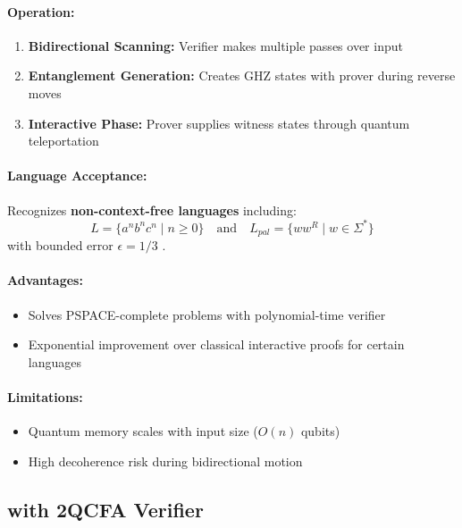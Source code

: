 \paragraph{Operation:}
\begin{enumerate}
    \item \textbf{Bidirectional Scanning:} Verifier makes multiple passes over input
    \item \textbf{Entanglement Generation:} Creates GHZ states with prover during reverse moves
    \item \textbf{Interactive Phase:} Prover supplies witness states through quantum teleportation
\end{enumerate}

\paragraph{Language Acceptance:}
Recognizes \textbf{non-context-free languages} including:
\[
L = \{a^nb^nc^n \mid n \geq 0\} \quad \text{and} \quad L_{pal} = \{ww^R \mid w \in \Sigma^*\}
\]
with bounded error $\epsilon = 1/3$ \cite{zheng2012two}.

\paragraph{Advantages:}
\begin{itemize}
    \item Solves PSPACE-complete problems with polynomial-time verifier
    \item Exponential improvement over classical interactive proofs for certain languages
\end{itemize}

\paragraph{Limitations:}
\begin{itemize}
    \item Quantum memory scales with input size ($O(n)$ qubits)
    \item High decoherence risk during bidirectional motion
\end{itemize}

\subsection{ with 2QCFA Verifier}
\label{subsec:qmip2qcfa}

